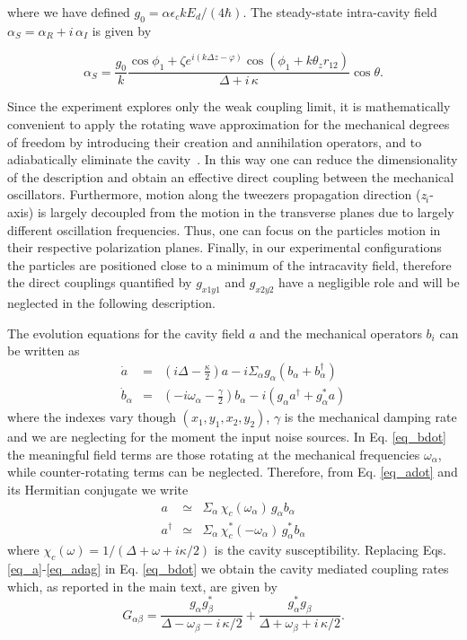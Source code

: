 \documentclass[aps,PRA,%
 amsmath,amssymb,
singlecolumn,
notitlepage,superscriptaddress,groupedaddress]{revtex4}
\newcommand{\di}{i}
\begin{document}
\noindent where we have defined $g_0=\alpha\epsilon_ckE_d/(4\hbar)$. The steady-state intra-cavity field $\alpha_S=\alpha_R+\di \,\alpha_I$ is given by

\begin{equation}
    \alpha_S=\frac{g_0}{k}\frac{\cos \phi_1+\zeta e^{i (k \Delta z-\varphi)}\cos(\phi_1+k\theta_z r_{12})}{\Delta+ \di \,\kappa}\cos \theta.
\end{equation}

Since the experiment explores only the weak coupling limit, it is mathematically convenient to apply the rotating wave approximation for the mechanical degrees of freedom by introducing their creation and annihilation operators, and to adiabatically eliminate the cavity~\cite{Vijayan2024Cavity-mediated}. In this way one can reduce the dimensionality of the description and obtain an effective direct coupling between the mechanical oscillators. Furthermore, motion along the tweezers propagation direction (\emph{z}$_i$-axis) is largely decoupled from the motion in the transverse planes due to largely different oscillation frequencies. Thus, one can focus on the particles motion in their respective polarization planes. Finally, in our experimental configurations the particles are positioned close to a minimum of the intracavity field, therefore the direct couplings quantified by $g_{x1y1}$ and $g_{x2y2}$ have a negligible role and will be neglected in the following description.

The evolution equations for the cavity field $a$ and the mechanical operators $b_i$ can be written as 
\begin{eqnarray}
\dot{a} &=& \left(i\Delta-\frac{\kappa}{2}\right) a - i \Sigma_\alpha g_\alpha (b_\alpha + b^{\dagger}_\alpha) 
\label{eq_adot}\\
\dot{b}_\alpha &=& \left(-i\omega_\alpha-\frac{\gamma}{2}\right) b_\alpha -i (g_\alpha a^{\dagger}+g_\alpha^* a)
\label{eq_bdot}
\end{eqnarray}
where  the indexes vary though $(x_1,y_1,x_2,y_2)$, $\gamma$ is the mechanical damping rate and we are neglecting for the moment the input noise sources. In Eq. \ref{eq_bdot} the meaningful field terms are those rotating at the mechanical frequencies $\omega_\alpha$, while counter-rotating terms can be neglected. Therefore, from Eq. \ref{eq_adot} and its Hermitian conjugate we write 
\begin{eqnarray}
a &\simeq& \Sigma_\alpha\, \chi_c (\omega_\alpha)\, g_\alpha b_\alpha  
\label{eq_a}\\
a^{\dagger} &\simeq&  \Sigma_\alpha\, \chi_c^* (-\omega_\alpha) \,g_\alpha^* b_\alpha  
\label{eq_adag}
\end{eqnarray}
where $\chi_c (\omega) = 1/(\Delta + \omega +i \kappa/2)$ is the cavity susceptibility. Replacing Eqs. \ref{eq_a}-\ref{eq_adag} in Eq. \ref{eq_bdot} we obtain the cavity mediated coupling rates which, as reported in the main text, are given by
\begin{equation}\label{eq4s}
   G_{\alpha\beta}=\frac{g_\alpha g^*_{\beta}}{\Delta - \omega_\beta - \di\, \kappa/2} + \frac{g^*_\alpha g_{\beta}}{\Delta + \omega_\beta +\di\, \kappa/2}.
\end{equation}
\end{document}
